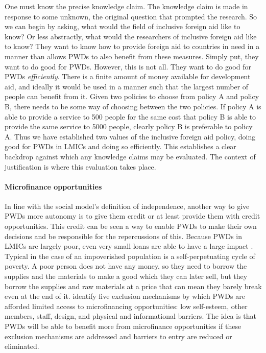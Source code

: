 \documentclass[a4paper]{article}
\begin{document}
One must know the precise knowledge claim. The knowledge claim is made in
response to some unknown, the original question that prompted the research.
So we can begin by asking, what would the field of inclusive foreign aid like
to know? Or less abstractly, what would the researchers of inclusive foreign
aid like to know? They want to know how to provide foreign aid to countries in
need in a manner than allows PWDs to also benefit from these measures. Simply
put, they want to do good for PWDs. However, this is not all. They want to do
good for PWDs \emph{efficiently}. There is a finite amount of money available
for development aid, and ideally it would be used in a manner such that the
largest number of people can benefit from it. Given two policies to choose
from policy A and policy B, there needs to be some way of choosing between the
two policies. If policy A is able to provide a service to 500 people for the
same cost that policy B is able to provide the same service to 5000 people,
clearly policy B is preferable to policy A. Thus we have established two
values of the inclusive foreign aid policy, doing good for PWDs in LMICs and
doing so efficiently. This establishes a clear backdrop against which any
knowledge claims may be evaluated. The context of justification is where this
evaluation takes place.

\paragraph{Microfinance opportunities}

In line with the social model's definition of independence, another way to
give PWDs more autonomy is to give them credit or at least provide them with
credit opportunities. This credit can be seen a way to enable PWDs to make
their own decisions and be responsible for the repercussions of this. Because
PWDs in LMICs are largely poor, even very small loans are able to have a large
impact \citep{wendt2006building}.  Typical in the case of an impoverished
population is a self-perpetuating cycle of poverty. A poor person does not have
any money, so they need to borrow the supplies and the materials to make a
good which they can later sell, but they borrow the supplies and raw materials
at a price that can mean they barely break even at the end of it.
\cite{mersland2008access} identify five exclusion mechanisms by which PWDs are
afforded limited access to microfinancing opportunities: low self-esteem,
other members, staff, design, and physical and informational barriers. The
idea is that PWDs will be able to benefit more from microfinance opportunities
if these exclusion mechanisms are addressed and barriers to entry are reduced
or eliminated.
\end{document}
